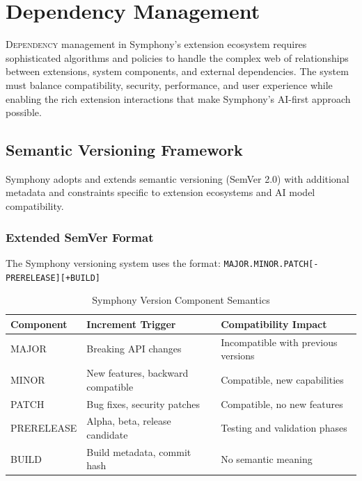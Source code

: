 
\section{Dependency Management}
\label{sec:dependency-management}

\lettrine{D}{ependency} management in Symphony's extension ecosystem requires sophisticated algorithms and policies to handle the complex web of relationships between extensions, system components, and external dependencies. The system must balance compatibility, security, performance, and user experience while enabling the rich extension interactions that make Symphony's AI-first approach possible.

\subsection{Semantic Versioning Framework}
\label{subsec:semantic-versioning-framework}

Symphony adopts and extends semantic versioning (SemVer 2.0) with additional metadata and constraints specific to extension ecosystems and AI model compatibility.

\subsubsection{Extended SemVer Format}
\label{subsubsec:extended-semver-format}

The Symphony versioning system uses the format: \texttt{MAJOR.MINOR.PATCH[-PRERELEASE][+BUILD]}

\begin{table}[h]
\centering
\caption{Symphony Version Component Semantics}
\label{tab:version-semantics}
\begin{tabular}{@{}lll@{}}
\toprule
\textbf{Component} & \textbf{Increment Trigger} & \textbf{Compatibility Impact} \\
\midrule
MAJOR & Breaking API changes & Incompatible with previous versions \\
MINOR & New features, backward compatible & Compatible, new capabilities \\
PATCH & Bug fixes, security patches & Compatible, no new features \\
PRERELEASE & Alpha, beta, release candidate & Testing and validation phases \\
BUILD & Build metadata, commit hash & No semantic meaning \\
\bottomrule
\end{tabular}
\end{table}

